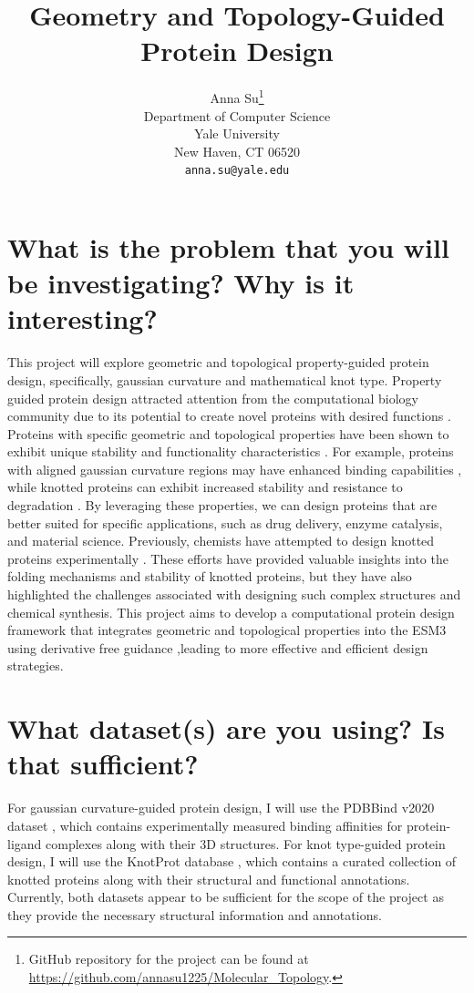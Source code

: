 \documentclass{article}
\title{Geometry and Topology-Guided Protein Design}
\author{
  Anna Su\thanks{GitHub repository for the project can be found at \url{https://github.com/annasu1225/Molecular_Topology}.} \\
  Department of Computer Science\\
  Yale University\\
  New Haven, CT 06520 \\
  \texttt{anna.su@yale.edu} \\
}
\begin{document}
\maketitle

\section{What is the problem that you will be investigating?
Why is it interesting?}
This project will explore geometric and topological property-guided protein design, specifically, gaussian curvature and mathematical knot type.
Property guided protein design attracted attention from the computational biology community due to its potential to create novel proteins with desired functions \cite{Tagasovska2022,Hong2024,Luo2025}.
Proteins with specific geometric and topological properties have been shown to exhibit unique stability and functionality characteristics \cite{Sukowska2008,Hsu2024,Madsen2025}.
For example, proteins with aligned gaussian curvature regions may have enhanced binding capabilities \cite{Brannigan2007}, while knotted proteins can exhibit increased stability and resistance to degradation \cite{Sukowska2012,Faisca2015,Lim2015}.
By leveraging these properties, we can design proteins that are better suited for specific applications, such as drug delivery, enzyme catalysis, and material science.
Previously, chemists have attempted to design knotted proteins experimentally \cite{King2010, Doyle2023}. These efforts have provided valuable insights into the folding mechanisms and stability of knotted proteins, but they have also highlighted the challenges associated with designing such complex structures and chemical synthesis.
This project aims to develop a computational protein design framework that integrates geometric and topological properties into the ESM3 \cite{Hayes2025} using derivative free guidance \cite{Li2024},leading to more effective and efficient design strategies.

\section{What dataset(s) are you using? Is that sufficient?}
For gaussian curvature-guided protein design, I will use the PDBBind v2020 dataset \cite{Wang2005}, which contains experimentally measured binding affinities for protein-ligand complexes along with their 3D structures.
For knot type-guided protein design, I will use the KnotProt database \cite{Dabrowski-Tumanski2019}, which contains a curated collection of knotted proteins along with their structural and functional annotations.
Currently, both datasets appear to be sufficient for the scope of the project as they provide the necessary structural information and annotations.
\end{document}
